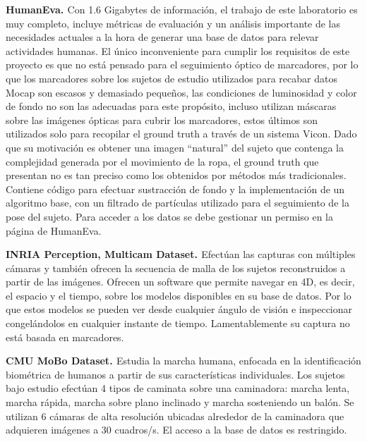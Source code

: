 \textbf{HumanEva. \cite{HumanEvaWeb}}
Con 1.6 Gigabytes de información, el trabajo de este laboratorio es muy completo, incluye métricas de evaluación y un análisis importante de las necesidades actuales a la hora de generar una base de datos para relevar actividades humanas. El único inconveniente para cumplir los requisitos de este proyecto es que no está pensado para el seguimiento óptico de marcadores, por lo que los marcadores sobre los sujetos de estudio utilizados para recabar datos Mocap son escasos y demasiado pequeños, las condiciones de luminosidad y color de fondo no son las adecuadas para este propósito, incluso utilizan máscaras sobre las imágenes ópticas para cubrir los marcadores, estos últimos son utilizados solo para recopilar el ground truth a través de un sistema Vicon.  Dado que su motivación es obtener una imagen ``natural'' del sujeto que contenga la complejidad generada por el movimiento de la ropa, el ground truth que presentan  no es tan preciso como los obtenidos por métodos más tradicionales.  Contiene código para efectuar sustracción de fondo y la implementación de un algoritmo base, con un filtrado de partículas utilizado para el seguimiento de la pose del sujeto. Para acceder a los datos se debe gestionar un permiso en la página de HumanEva. 

\textbf{INRIA Perception, Multicam Dataset. \cite{INRIA}}
Efectúan las capturas con múltiples cámaras y también ofrecen la secuencia de malla de los sujetos reconstruidos a partir de las imágenes. Ofrecen un software que permite navegar en 4D, es decir, el espacio y el tiempo, sobre los modelos disponibles en su base de datos. Por lo que estos modelos se pueden ver desde cualquier ángulo de visión e inspeccionar congelándolos en cualquier instante de tiempo. Lamentablemente su captura no está basada en marcadores. 

\textbf{CMU MoBo Dataset. \cite{Mobo}}
Estudia la marcha humana, enfocada en la identificación biométrica de humanos a partir de sus características individuales. Los sujetos bajo estudio efectúan 4 tipos de caminata sobre una caminadora: marcha lenta, marcha rápida, marcha sobre plano inclinado y marcha sosteniendo un balón. Se utilizan 6 cámaras de alta resolución ubicadas alrededor de la caminadora que adquieren imágenes a 30 cuadros/s. El acceso a la base de datos es restringido.

